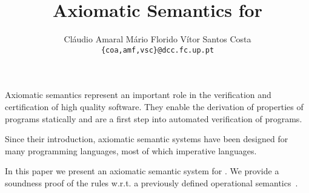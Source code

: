 \documentclass[11pt,twoside]{article}
\makeatletter
\def\cleardoublepage{\clearpage\if@twoside \ifodd\c@page\else%
\hbox{}%
\thispagestyle{empty}
\newpage%
\if@twocolumn\hbox{}\newpage\fi\fi\fi}
\makeatother
\begin{document}
\trtitle{\PaperTitle}


\mkcoverpage

\title{Axiomatic Semantics for \Prolog}
\author{Cl\'audio Amaral\authorScholarship \hspace{0.5cm}
 M\'ario Florido \hspace{0.5cm}
V\'itor Santos Costa
\\ {\tt \{coa,amf,vsc\}@dcc.fc.up.pt}}

\date{}
\cleardoublepage

\maketitle

\abstract

Axiomatic semantics represent an important role in the verification and
certification of high quality software.
%
They enable the derivation of properties of programs statically and are
a first step into automated verification of programs.


Since their introduction, axiomatic semantic systems have been designed
for many programming languages, most of which imperative languages.


In this paper we present an axiomatic semantic system for \Prolog.
%
We provide a soundness proof of the rules w.r.t. a previously defined
operational semantics~\cite{PlOpSem}.






\end{document}
